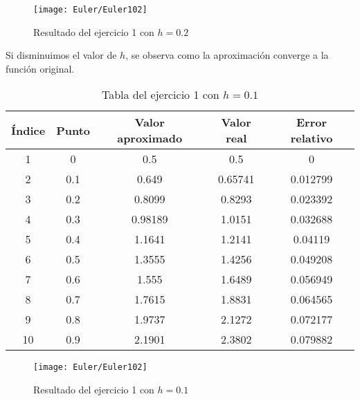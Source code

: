 \begin{figure}[H]
    \texttt{[image: Euler/Euler102]}
    \centering
    \caption{Resultado del ejercicio 1 con \(h = 0.2\)}\label{fig:euler-1-0-2}
\end{figure}

Si disminuimos el valor de \(h\), se observa como la aproximación converge
a la función original.

\begin{table}[H]
    \begin{center}
        \begin{tabular}{ |c|c|c|c|c| }
            \hline
            Índice & Punto & Valor aproximado & Valor real & Error relativo \\
            \hline
            \hline
            1      & 0     & 0.5              & 0.5        & 0              \\
            \hline
            2      & 0.1   & 0.649            & 0.65741    & 0.012799       \\
            \hline
            3      & 0.2   & 0.8099           & 0.8293     & 0.023392       \\
            \hline
            4      & 0.3   & 0.98189          & 1.0151     & 0.032688       \\
            \hline
            5      & 0.4   & 1.1641           & 1.2141     & 0.04119        \\
            \hline
            6      & 0.5   & 1.3555           & 1.4256     & 0.049208       \\
            \hline
            7      & 0.6   & 1.555            & 1.6489     & 0.056949       \\
            \hline
            8      & 0.7   & 1.7615           & 1.8831     & 0.064565       \\
            \hline
            9      & 0.8   & 1.9737           & 2.1272     & 0.072177       \\
            \hline
            10     & 0.9   & 2.1901           & 2.3802     & 0.079882       \\
            \hline
        \end{tabular}
    \end{center}
    \caption{Tabla del ejercicio 1 con \(h = 0.1\)}\label{tab:euler-1-0-1}
\end{table}

\begin{figure}[H]
    \texttt{[image: Euler/Euler102]}
    \centering
    \caption{Resultado del ejercicio 1 con \(h = 0.1\)}\label{fig:euler-1-0-1}
\end{figure}

